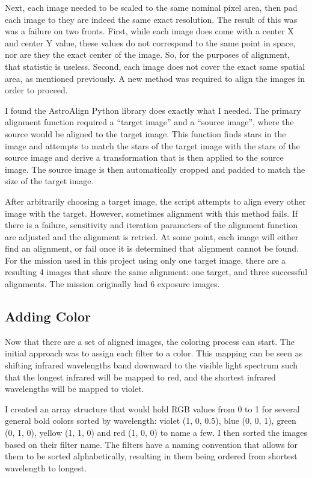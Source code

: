 \documentclass[10pt,twocolumn,letterpaper]{article}
\begin{document}
Next, each image needed to be scaled to the same nominal pixel area, then pad each image to they are indeed the same exact resolution. The result of this was was a failure on two fronts. First, while each image does come with a center X and center Y value, these values do not correspond to the same point in space, nor are they the exact center of the image. 
So, for the purposes of alignment, that statistic is useless. Second, each image does not cover the exact same spatial area, as mentioned previously. A new method was required to align the images in order to proceed.

I found the AstroAlign Python library does exactly what I needed. The primary alignment function required a ``target image'' and a ``source image'', where the source would be aligned to the target image. This function finds stars in the image and attempts to match the stars of the target image with the stars of the source image and derive a transformation that is then applied to the source image. The source image is then automatically cropped and padded to match the size of the target image.

After arbitrarily choosing a target image, the script attempts to align every  other image with the target. However, sometimes alignment with this method fails. If there is a failure, sensitivity and iteration parameters of the alignment function are adjusted and the alignment is retried. 
At some point, each image will either find an alignment, or fail once it is determined that alignment cannot be found. For the mission used in this project using only one target image, there are a resulting 4 images that share the same alignment: one target, and three successful alignments. The mission originally had 6 exposure images.

\subsection{Adding Color}
Now that there are a set of aligned images, the coloring process can start. The initial approach was to assign each filter to a color. This mapping can be seen as shifting infrared wavelengths band downward to the visible light spectrum such that the longest infrared will be mapped to red, and the shortest infrared wavelengths will be mapped to violet.

I created an array structure that would hold RGB values from 0 to 1 for several general bold colors sorted by wavelength: violet (1, 0, 0.5), blue (0, 0, 1), green (0, 1, 0), yellow (1, 1, 0) and red (1, 0, 0) to name a few. I then sorted the images based on their filter name. The filters have a naming convention that allows for them to be sorted alphabetically, resulting in them being ordered from shortest wavelength to longest.
\end{document}
